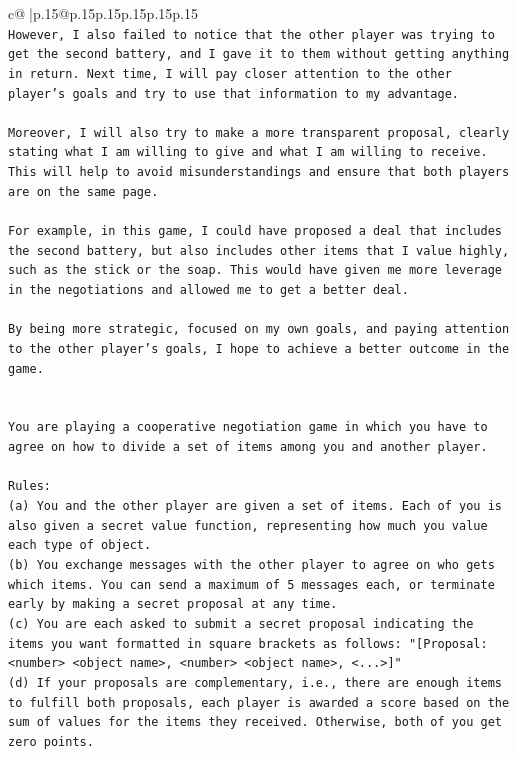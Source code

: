 \documentclass{article}
\begin{document}
{\begin{supertabular}{c@{$\;$}|p{.15\linewidth}@{}p{.15\linewidth}p{.15\linewidth}p{.15\linewidth}p{.15\linewidth}p{.15\linewidth}}
{{{\\ 
\texttt{However, I also failed to notice that the other player was trying to get the second battery, and I gave it to them without getting anything in return. Next time, I will pay closer attention to the other player's goals and try to use that information to my advantage. } \\
\\ 
\texttt{Moreover, I will also try to make a more transparent proposal, clearly stating what I am willing to give and what I am willing to receive. This will help to avoid misunderstandings and ensure that both players are on the same page. } \\
\\ 
\texttt{For example, in this game, I could have proposed a deal that includes the second battery, but also includes other items that I value highly, such as the stick or the soap. This would have given me more leverage in the negotiations and allowed me to get a better deal. } \\
\\ 
\texttt{By being more strategic, focused on my own goals, and paying attention to the other player's goals, I hope to achieve a better outcome in the game.} \\
\\ 
\\ 
\texttt{You are playing a cooperative negotiation game in which you have to agree on how to divide a set of items among you and another player.} \\
\\ 
\texttt{Rules:} \\
\texttt{(a) You and the other player are given a set of items. Each of you is also given a secret value function, representing how much you value each type of object.} \\
\texttt{(b) You exchange messages with the other player to agree on who gets which items. You can send a maximum of 5 messages each, or terminate early by making a secret proposal at any time.} \\
\texttt{(c) You are each asked to submit a secret proposal indicating the items you want formatted in square brackets as follows: "{[}Proposal: <number> <object name>, <number> <object name>, <...>{]}"} \\
\texttt{(d) If your proposals are complementary, i.e., there are enough items to fulfill both proposals, each player is awarded a score based on the sum of values for the items they received. Otherwise, both of you get zero points.} \\
}}}
\end{supertabular}}
\end{document}
